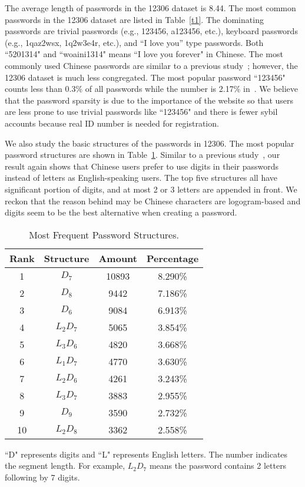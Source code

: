 The average length of passwords in the 12306 dataset is 8.44. The most
common passwords in the 12306 dataset are listed in Table~\ref{t1}.
The dominating passwords are trivial passwords (e.g., 123456, a123456,
etc.), keyboard passwords (e.g., 1qaz2wsx, 1q2w3e4r, etc.), and ``I
love you'' type passwords. Both ``5201314" and ``woaini1314" means ``I
love you forever" in Chinese. The most commonly used Chinese passwords
are similar to a previous study~\cite{li2014large}; however, the 12306
dataset is much less congregated. The most popular password ``123456"
counts less than 0.3\% of all passwords while the number is 2.17\%
in~\cite{li2014large}. We believe that the password sparsity is due to
the importance of the website so that users are less prone to use
trivial passwords like ``123456" and there is fewer sybil accounts
because real ID number is needed for registration.

We also study the basic structures of the passwords in 12306. The most
popular password structures are shown in Table~\ref{t2}. Similar to a
previous study~\cite{li2014large}, our result again shows that Chinese
users prefer to use digits in their passwords instead of letters as
English-speaking users. The top five structures all have significant
portion of digits, and at most 2 or 3 letters are appended in
front. We reckon that the reason behind may be Chinese characters are
logogram-based and digits seem to be the best alternative when
creating a password.

\begin{table}
\centering
\begin{threeparttable}
\caption{Most Frequent Password Structures.}
\begin{tabular}{|c|c|c|c|} \hline
Rank&Structure&Amount&Percentage\\ \hline
1&$D_7$&10893&8.290\%\\ 
2&$D_8$&9442&7.186\%\\ 
3&$D_6$&9084&6.913\%\\ 
4&$L_2D_7$&5065&3.854\%\\ 
5&$L_3D_6$&4820&3.668\%\\ 
6&$L_1D_7$&4770&3.630\%\\ 
7&$L_2D_6$&4261&3.243\%\\ 
8&$L_3D_7$&3883&2.955\%\\ 
9&$D_9$&3590&2.732\%\\ 
10&$L_2D_8$&3362&2.558\%\\ 
\hline\end{tabular}
\label{t2}
\begin{tablenotes}
      \small
      \item ``D" represents digits and ``L" represents English letters. The number indicates the segment length. For example, $L_2D_7$ means the password contains 2 letters following by 7 digits.
    \end{tablenotes}
    \end{threeparttable}
\vspace{-0.1in}
\end{table}

